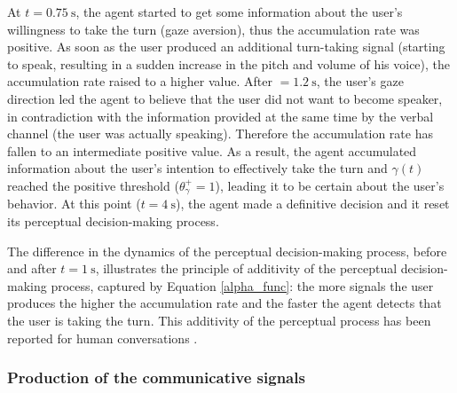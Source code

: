 At $t=0.75~\text{s}$, the agent started to get some information about the user's willingness to take the turn (gaze aversion), thus the accumulation rate was positive. 
As soon as the user produced an additional turn-taking signal (starting to speak, resulting in a sudden increase in the pitch and volume of his voice), the accumulation rate raised to a higher value. 
After $=1.2~\text{s}$, the user's gaze direction led the agent to believe that the user did not want to become speaker, in contradiction with the information provided at the same time by the verbal channel (the user was actually speaking). Therefore the accumulation rate has fallen to an intermediate positive value. 
As a result, the agent accumulated information about the user's intention to effectively take the turn and $\gamma(t)$ reached the positive threshold ($\theta_{\gamma}^{+}=1$), leading it to be certain about the user's behavior. At this point ($t=4~\text{s}$), the agent made a definitive decision and it reset its perceptual decision-making process. 


The  difference in the dynamics of the perceptual decision-making process, before and after $t=1~\text{s}$, illustrates the principle of additivity of the perceptual decision-making process, captured by Equation \ref{alpha_func}: the more signals the user produces
 the higher the accumulation rate and the faster the agent detects that the user is taking the turn. This additivity of the perceptual process has been reported for human conversations \citep{gravano_turn-taking_2011,hjalmarsson_additive_2011}. 

\subsubsection{Production of the communicative signals}

